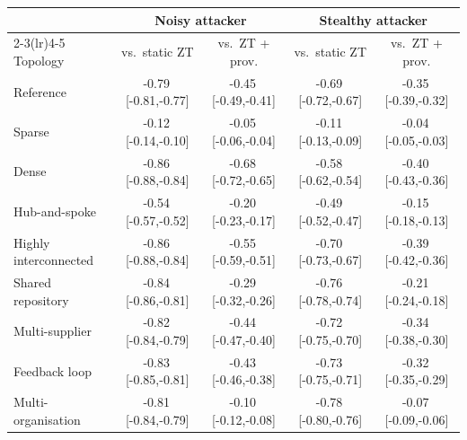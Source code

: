 \begin{tabular}{@{}lcccc@{}}
\toprule
 & \multicolumn{2}{c}{Noisy attacker} & \multicolumn{2}{c}{Stealthy attacker} \\
\cmidrule(lr){2-3}\cmidrule(lr){4-5}
Topology & vs.\ static ZT & vs.\ ZT + prov. & vs.\ static ZT & vs.\ ZT + prov. \\
\midrule
Reference & -0.79\,[-0.81,-0.77] & -0.45\,[-0.49,-0.41] & -0.69\,[-0.72,-0.67] & -0.35\,[-0.39,-0.32] \\
Sparse & -0.12\,[-0.14,-0.10] & -0.05\,[-0.06,-0.04] & -0.11\,[-0.13,-0.09] & -0.04\,[-0.05,-0.03] \\
Dense & -0.86\,[-0.88,-0.84] & -0.68\,[-0.72,-0.65] & -0.58\,[-0.62,-0.54] & -0.40\,[-0.43,-0.36] \\
Hub-and-spoke & -0.54\,[-0.57,-0.52] & -0.20\,[-0.23,-0.17] & -0.49\,[-0.52,-0.47] & -0.15\,[-0.18,-0.13] \\
Highly interconnected & -0.86\,[-0.88,-0.84] & -0.55\,[-0.59,-0.51] & -0.70\,[-0.73,-0.67] & -0.39\,[-0.42,-0.36] \\
Shared repository & -0.84\,[-0.86,-0.81] & -0.29\,[-0.32,-0.26] & -0.76\,[-0.78,-0.74] & -0.21\,[-0.24,-0.18] \\
Multi-supplier & -0.82\,[-0.84,-0.79] & -0.44\,[-0.47,-0.40] & -0.72\,[-0.75,-0.70] & -0.34\,[-0.38,-0.30] \\
Feedback loop & -0.83\,[-0.85,-0.81] & -0.43\,[-0.46,-0.38] & -0.73\,[-0.75,-0.71] & -0.32\,[-0.35,-0.29] \\
Multi-organisation & -0.81\,[-0.84,-0.79] & -0.10\,[-0.12,-0.08] & -0.78\,[-0.80,-0.76] & -0.07\,[-0.09,-0.06] \\
\bottomrule
\end{tabular}
